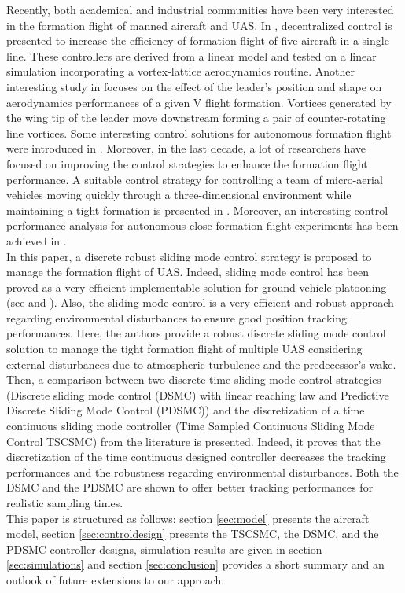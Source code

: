 \documentclass{ifacconf}
\begin{document}
Recently, both academical and industrial communities have been very interested in the formation flight of manned aircraft and UAS. In \cite{wolfe1996decentralized}, decentralized control is presented to increase the efficiency of formation flight of five aircraft in a single line. These controllers are derived from a linear model and tested on a linear simulation incorporating a vortex-lattice aerodynamics routine. Another interesting study in \cite{thien2008effects} focuses on the effect of the leader's position and shape on aerodynamics performances of a given V flight formation. Vortices generated by the wing tip of the leader move downstream forming a pair of counter-rotating line vortices. Some interesting control solutions for autonomous formation flight were introduced in \cite{giulietti2000autonomous}. Moreover, in the last decade, a lot of researchers have focused on improving the control strategies to enhance the formation flight performance. A suitable control strategy for  controlling a team of micro-aerial vehicles moving quickly through a three-dimensional environment while maintaining a tight formation is presented in \cite{turpin2012trajectory}. Moreover, an interesting control performance analysis for autonomous close formation flight experiments has been achieved in \cite{rice2014control}.\\
In this paper, a discrete robust sliding mode control strategy is proposed to manage the formation flight of UAS. Indeed, sliding mode control has been proved as a very efficient implementable solution for ground vehicle platooning (see \cite{ferrara2008sliding} and \cite{zou2013distributed}). Also, the sliding mode control is a very efficient and robust approach regarding environmental disturbances to ensure good position tracking performances. 
Here, the authors provide a robust discrete sliding mode control solution to manage the tight formation flight of multiple UAS considering external disturbances due to atmospheric turbulence and the predecessor's wake. Then, a comparison between two discrete time sliding mode control strategies (Discrete sliding mode control (DSMC) with linear reaching law and Predictive Discrete Sliding Mode Control (PDSMC)) and the discretization of a time continuous sliding mode controller (Time Sampled Continuous Sliding Mode Control TSCSMC) from the literature is presented. Indeed, it proves that the discretization of the time continuous designed controller decreases the tracking performances and the robustness regarding environmental disturbances.
Both the DSMC and the PDSMC are shown to offer better tracking performances for realistic sampling times.\\
This paper is structured as follows: section \ref{sec:model} presents the aircraft model, section \ref{sec:controldesign} presents the TSCSMC, the DSMC, and the PDSMC controller designs, simulation results are given in section \ref{sec:simulations} and section \ref{sec:conclusion} provides a short summary and an outlook of future extensions to our approach.
\end{document}
